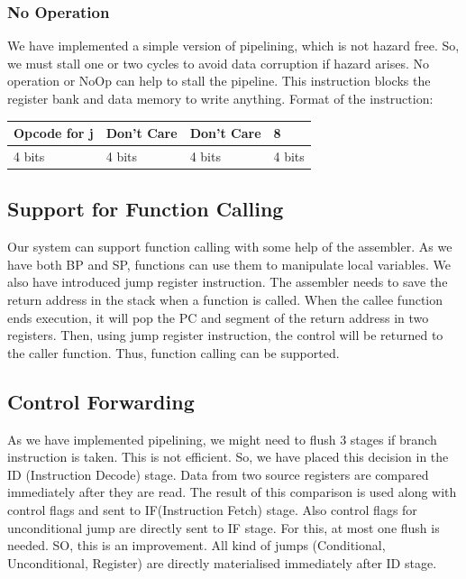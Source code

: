 \documentclass[12pt]{article}
\begin{document}
\subsubsection{No Operation}
We have implemented a simple version of pipelining, which is not hazard free. So, we must stall one or two cycles to avoid data corruption if hazard arises. No operation or NoOp can help to stall the pipeline. This instruction blocks the register bank and data memory to write anything. Format of the instruction: \newline
\vspace{15}
\begin{tabular}{|p{3cm}|p{3cm}|p{3cm}|p{2.5cm}|}
    \hline
     Opcode for j & Don't Care & Don't Care & 8 \\
     \hline
     4 bits & 4 bits & 4 bits & 4 bits \\ 
     \hline
\end{tabular}
\subsection{Support for Function Calling}
Our system can support function calling with some help of the assembler. As we have both BP and SP, functions can use them to manipulate local variables. We also have introduced jump register instruction. The assembler needs to save the return address in the stack when a function is called. When the callee function ends execution, it will pop the PC and segment of the return address in two registers. Then, using jump register instruction, the control will be returned to the caller function. Thus, function calling can be supported.

\subsection{Control Forwarding}
As we have implemented pipelining, we might need to flush 3 stages if branch instruction is taken. This is not efficient. So, we have placed this decision in the ID (Instruction Decode) stage. Data from two source registers are compared immediately after they are read. The result of this comparison is used along with control flags and sent to IF(Instruction Fetch) stage. Also control flags for unconditional jump are directly sent to IF stage. For this, at most one flush is needed. SO, this is an improvement. All kind of jumps (Conditional, Unconditional, Register) are directly materialised immediately after ID stage.

\newpage
\end{document}
